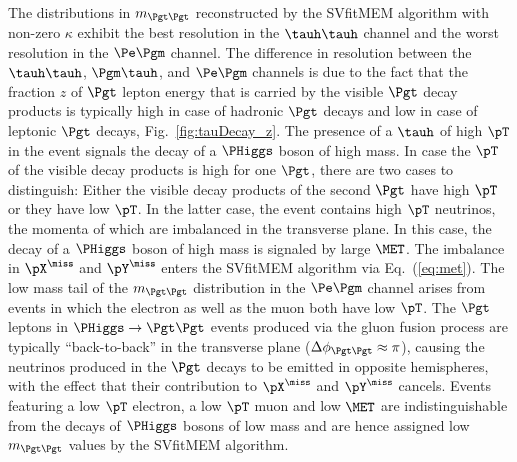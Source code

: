 The distributions in $m_{\Pgt\Pgt}$ reconstructed by the
SVfitMEM algorithm with non-zero $\kappa$ exhibit the best
resolution in the $\tauh\tauh$ channel and the worst resolution in the $\Pe\Pgm$ channel.
The difference in resolution between the $\tauh\tauh$, $\Pgm\tauh$,
and $\Pe\Pgm$ channels
is due to the fact that the fraction $z$ of
$\Pgt$ lepton energy that is carried by the visible $\Pgt$ decay
products is typically high in case of hadronic $\Pgt$ decays
and low in case of leptonic $\Pgt$ decays, \cf Fig.~\ref{fig:tauDecay_z}.
The presence of a $\tauh$ of high $\pT$ in the event signals the decay of a
$\PHiggs$ boson of high mass.
In case the $\pT$ of the visible decay products is high
for one $\Pgt$, there are two cases to distinguish:
Either the visible decay products of the second $\Pgt$ have high $\pT$ or they have low $\pT$.
In the latter case, the event contains high $\pT$ neutrinos, the momenta of which are imbalanced in the transverse plane.
In this case, the decay of a $\PHiggs$ boson of high mass is signaled by large $\MET$.
The imbalance in $\pX^{\miss}$ and $\pY^{\miss}$ enters the
SVfitMEM algorithm via Eq.~(\ref{eq:met}).
The low mass tail of the $m_{\Pgt\Pgt}$ distribution in the $\Pe\Pgm$
channel arises from events in which the electron as well as the muon
both have low $\pT$.
The $\Pgt$ leptons in $\PHiggs \to \Pgt\Pgt$ events produced via the
gluon fusion process are typically ``back-to-back'' in the transverse plane ($\Delta\phi_{\Pgt\Pgt} \approx \pi$),
causing the neutrinos produced in the $\Pgt$ decays to be emitted in
opposite hemispheres, with the effect that their contribution to $\pX^{\miss}$ and $\pY^{\miss}$ cancels.
Events featuring a low $\pT$ electron, a low $\pT$ muon and low $\MET$
are indistinguishable from the decays of $\PHiggs$ bosons of low mass
and are hence assigned low $m_{\Pgt\Pgt}$ values by the SVfitMEM algorithm.

